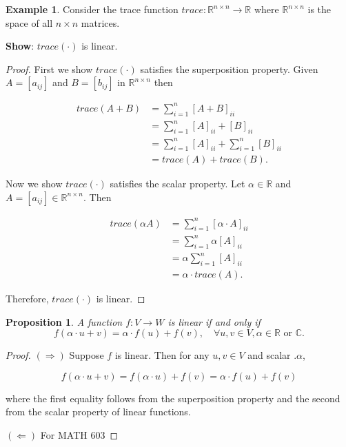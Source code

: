 \documentclass[12pt]{article}
\newtheorem*{proposition}{Proposition}
\theoremstyle{definition}
\newtheorem*{example}{Example}
\begin{document}
\begin{example}
Consider the trace function $trace : \mathbb{R}^{n \times n} \rightarrow \mathbb{R}$ where 
$\mathbb{R}^{n \times n}$ is the space of all $n \times n$ matrices.

\textbf{Show}: $trace(\cdot)$ is linear. 

\begin{proof}
First we show $trace(\cdot)$ satisfies the superposition property. Given $A = [a_{ij}]$ and
$B = [b_{ij}]$ in $\mathbb{R}^{n \times n}$ then

\begin{align*}
trace(A + B) &= \sum^{n}_{i = 1} [A + B]_{ii} \\
&= \sum^{n}_{i = 1} [A]_{ii} + [B]_{ii} \\
&= \sum^{n}_{i = 1} [A]_{ii} + \sum^{n}_{i = 1} [B]_{ii} \\
&= trace(A) + trace(B).
\end{align*}

Now we show $trace(\cdot)$ satisfies the scalar property. Let $\alpha \in \mathbb{R}$ and 
$A = [a_{ij}] \in \mathbb{R}^{n \times n}$. Then

\begin{align*}
trace(\alpha A) &= \sum^{n}_{i = 1} [\alpha \cdot A]_{ii} \\
&= \sum^{n}_{i = 1} \alpha [A]_{ii} \\
&= \alpha \sum^{n}_{i = 1} [A]_{ii} \\
&= \alpha \cdot trace(A).
\end{align*}

Therefore, $trace(\cdot)$ is linear.
\end{proof}
\end{example}

\begin{proposition}
A function $f : V \rightarrow W$ is linear if and only if 
$$f(\alpha \cdot u + v) = \alpha \cdot f(u) + f(v), \quad \forall u, v \in V, \alpha \in
\mathbb{R} \text{ or } \mathbb{C}.$$
\end{proposition}

\begin{proof}
$(\Rightarrow)$ Suppose $f$ is linear. Then for any $u, v \in V$ and scalar .$\alpha$,

$$f(\alpha \cdot u + v) = f(\alpha \cdot u) + f(v) = \alpha \cdot f(u) + f(v)$$

where the first equality follows from the superposition property and the second from
the scalar property of linear functions.

$(\Leftarrow)$ For MATH 603
\end{proof}
\end{document}
